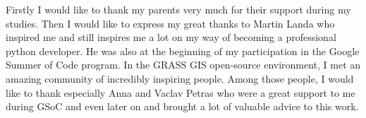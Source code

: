 \documentclass[a4paper,10pt,twoside]{article}
\begin{document}
Firstly I would like to thank my parents very much for their support during my studies. Then I would like to express my great thanks to Martin Landa who inspired me and still inspires me a lot on my way of becoming a professional python developer. He was also at the beginning of my participation in the Google Summer of Code program. In the GRASS GIS open-source environment, I met an amazing community of incredibly inspiring people. Among those people, I would like to thank especially Anna and Vaclav Petras who were a great support to me during GSoC and even later on and brought a lot of valuable advice to this work.


\newpage ~ \newpage
\thispagestyle{empty}


\newpage

\tableofcontents %
\listoffigures %

\thispagestyle{empty}
\newcommand{\obrazek}[1]{(viz obr. \ref{#1})} %

\newpage
\pagestyle{fancy}


\renewcommand{\sectionmark}[1]{\markright{\ #1}}

\fancyhf{} %
\renewcommand{\headrulewidth}{0.4pt} %
\renewcommand{\footrulewidth}{0.4pt}  %
\addtolength{\voffset}{-0.4cm}

\fancyhead[RE, RO]{\nouppercase{\rightmark}}
   
\fancyfoot[RO, LE]{{\textsc{\small \thepage}}}

\fancypagestyle{plain}{
  \fancyhead{} %
  \renewcommand{\headrulewidth}{0pt} %
}



\newpage
\vspace*{-1cm}
\pagestyle{fancy}
\end{document}
